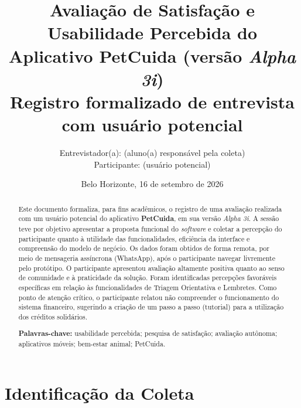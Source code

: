 \documentclass[12pt,a4paper]{article}
\title{\textbf{Avaliação de Satisfação e Usabilidade Percebida do\\
Aplicativo PetCuida (versão \textit{Alpha 3i})}\\[0.4cm]
\large Registro formalizado de entrevista com usuário potencial}
\author{Entrevistador(a): \entrevistador{} (aluno(a) responsável pela coleta)\\
Participante: \participante{} (usuário potencial)}
\date{Belo Horizonte, 16 de setembro de 2026}
\begin{document}
\maketitle
\thispagestyle{empty}

\begin{abstract}
\noindent Este documento formaliza, para fins acadêmicos, o registro de uma avaliação realizada com um usuário potencial do aplicativo \textbf{PetCuida}, em sua versão \textit{Alpha 3i}. A sessão teve por objetivo apresentar a proposta funcional do \textit{software} e coletar a percepção do participante quanto à utilidade das funcionalidades, eficiência da interface e compreensão do modelo de negócio. Os dados foram obtidos de forma remota, por meio de mensageria assíncrona (WhatsApp), após o participante navegar livremente pelo protótipo. O participante apresentou avaliação altamente positiva quanto ao senso de comunidade e à praticidade da solução. Foram identificadas percepções favoráveis específicas em relação às funcionalidades de Triagem Orientativa e Lembretes. Como ponto de atenção crítico, o participante relatou não compreender o funcionamento do sistema financeiro, sugerindo a criação de um passo a passo (tutorial) para a utilização dos créditos solidários.

\vspace{0.4cm}
\noindent\textbf{Palavras-chave:} usabilidade percebida; pesquisa de satisfação; avaliação autônoma; aplicativos móveis; bem-estar animal; PetCuida.
\end{abstract}

\newpage
\tableofcontents
\newpage

\section{Identificação da Coleta}
\end{document}
